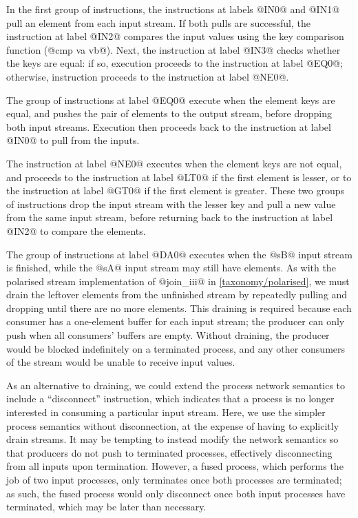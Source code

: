 In the first group of instructions, the instructions at labels @IN0@ and @IN1@ pull an element from each input stream.
If both pulls are successful, the instruction at label @IN2@ compares the input values using the key comparison function (@cmp va vb@).
Next, the instruction at label @IN3@ checks whether the keys are equal: if so, execution proceeds to the instruction at label @EQ0@; otherwise, instruction proceeds to the instruction at label @NE0@.

The group of instructions at label @EQ0@ execute when the element keys are equal, and pushes the pair of elements to the output stream, before dropping both input streams.
Execution then proceeds back to the instruction at label @IN0@ to pull from the inputs.

The instruction at label @NE0@ executes when the element keys are not equal, and proceeds to the instruction at label @LT0@ if the first element is lesser, or to the instruction at label @GT0@ if the first element is greater.
These two groups of instructions drop the input stream with the lesser key and pull a new value from the same input stream, before returning back to the instruction at label @IN2@ to compare the elements.

The group of instructions at label @DA0@ executes when the @sB@ input stream is finished, while the @sA@ input stream may still have elements.
As with the polarised stream implementation of @join_iii@ in \autoref{taxonomy/polarised}, we must drain the leftover elements from the unfinished stream by repeatedly pulling and dropping until there are no more elements.
This draining is required because each consumer has a one-element buffer for each input stream; the producer can only push when all consumers' buffers are empty.
Without draining, the producer would be blocked indefinitely on a terminated process, and any other consumers of the stream would be unable to receive input values.

As an alternative to draining, we could extend the process network semantics to include a ``disconnect'' instruction, which indicates that a process is no longer interested in consuming a particular input stream.
Here, we use the simpler process semantics without disconnection, at the expense of having to explicitly drain streams.
It may be tempting to instead modify the network semantics so that producers do not push to terminated processes, effectively disconnecting from all inputs upon termination.
However, a fused process, which performs the job of two input processes, only terminates once both processes are terminated; as such, the fused process would only disconnect once both input processes have terminated, which may be later than necessary.

